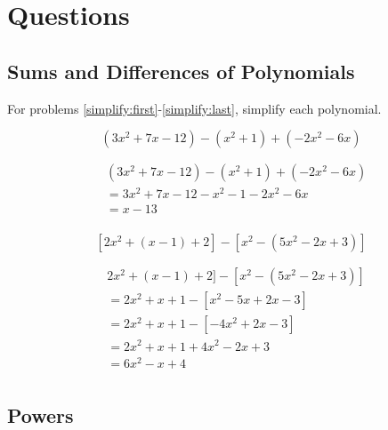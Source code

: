\documentclass[fleqn,addpoints]{exam}
\begin{document}
\fi

\section{Questions}

\subsection{Sums and Differences of Polynomials}

For problems \ref{simplify:first}-\ref{simplify:last}, simplify each polynomial.

\begin{questions}


\question[5]
\label{simplify:first}
\[ (3x^2 + 7x - 12) - (x^2 + 1) + (-2x^2 - 6x)\]
\begin{solution}[4 cm]

\begin{align*}
  & (3x^2 + 7x - 12) - (x^2 + 1) + (-2x^2 - 6x) \\
  &= 3x^2 + 7x - 12 - x^2 - 1 - 2x^2 - 6x \\
  &= x - 13 \\
\end{align*}

\end{solution}

\question[5]
\[ [2x^2 + (x - 1) + 2] - [x^2 - (5x^2 - 2x + 3)] \]
\label{simplify:last}
\begin{solution}[4 cm]

\begin{align*}
  & 2x^2 + (x - 1) + 2] - [x^2 - (5x^2 - 2x + 3)] \\
  &= 2x^2 + x + 1 - [x^2 - 5x + 2x - 3 ] \\
  &= 2x^2 + x + 1 - [-4x^2 + 2x - 3 ] \\
  &= 2x^2 + x + 1 + 4x^2 - 2x + 3 \\
  &= 6x^2 - x + 4 \\
\end{align*}

\end{solution}

\subsection{Powers}


\end{questions}
\end{document}
